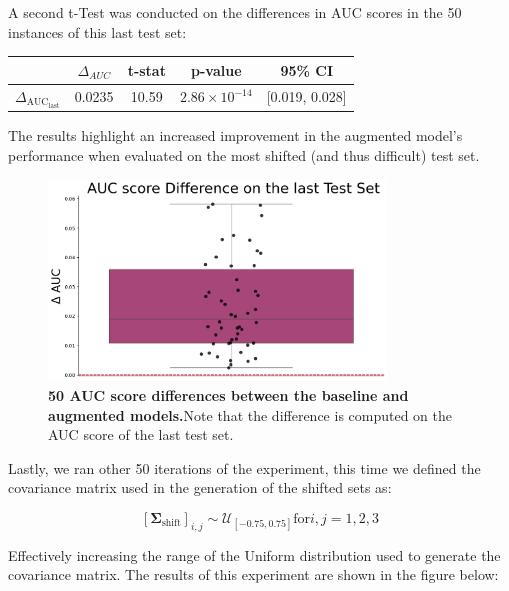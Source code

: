 A second t-Test was conducted on the differences in AUC scores in the 50 instances of this last test set:


\begin{table}[H]
    \centering
    \begin{tabular}{lcccc}
        \toprule
        & $\Delta_{AUC}$ & t-stat & p-value & 95\% CI \\
        \midrule
        $\Delta_{\text{AUC}_{\text{last}}}$ & 0.0235 & 10.59 & $2.86 \times 10^{-14}$ & [0.019, 0.028] \\
        \bottomrule
    \end{tabular}
\end{table}

The results highlight an increased improvement in the augmented model's performance when evaluated on the most shifted (and thus difficult) test set. 

\begin{figure}[H]
    \centering
    \includegraphics[width=0.8\textwidth]{assets/meandiffLAST.png} 
    \caption{\textbf{50 AUC score differences between the baseline and augmented models.}Note that the difference is computed on the AUC score of the last test set.}
\end{figure}

Lastly, we ran other 50 iterations of the experiment, this time we defined the covariance matrix used in the generation of the shifted sets as:

$$
[\boldsymbol{\Sigma}_{\text{shift}}]_{i,j} \sim \mathcal{U}_{[-0.75,0.75]} \text{for} i, j = 1, 2, 3
$$

Effectively increasing the range of the Uniform distribution used to generate the covariance matrix. The results of this experiment are shown in the figure below:

